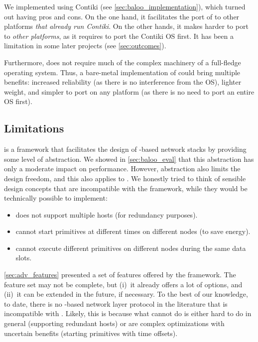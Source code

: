 We implemented \baloo using Contiki (see \cref{sec:baloo_implementation}), which turned out having pros and cons. On the one hand, it facilitates the port of \baloo to other platforms \emph{that already run Contiki}.
On the other hands, it makes \baloo harder to port to \emph{other platforms}, as it requires to port the Contiki OS first. It has been a limitation in some later projects (see \cref{sec:outcomes}).

Furthermore, \baloo does not require much of the complex machinery of a full-fledge operating system. Thus, a bare-metal implementation of \baloo could bring multiple benefits: increased reliability (as there is no interference from the OS), lighter weight, and simpler to port on any platform (as there is no need to port an entire OS first).


\subsection{Limitations}

\baloo is a framework that facilitates the design of \ST-based network stacks by providing some level of abstraction.
We showed in \cref{sec:baloo_eval} that this abstraction has only a moderate impact on performance.
However, abstraction also limits the design freedom, and this also applies to \baloo. We honestly tried to think of sensible design concepts that are incompatible with the framework, while they would be technically possible to implement:
\begin{itemize}
	\item \baloo does not support multiple hosts (\eg for redundancy purposes).
	\item \baloo cannot start primitives at different times on different nodes (\eg to save energy).
	\item \baloo cannot execute different \ST primitives on different nodes during the same data slots.
\end{itemize}

\cref{sec:adv_features} presented a set of features offered by the \baloo framework. The feature set may not be complete, but (i)~it already offers a lot of options, and (ii)~it can be extended in the future, if necessary.
To the best of our knowledge, to date,
there is no \ST-based network layer protocol in the literature that is incompatible with \baloo. Likely, this is because what \baloo cannot do is either hard to do in general (\eg supporting redundant hosts) or are complex optimizations with uncertain benefits (\eg starting primitives with time offsets).


